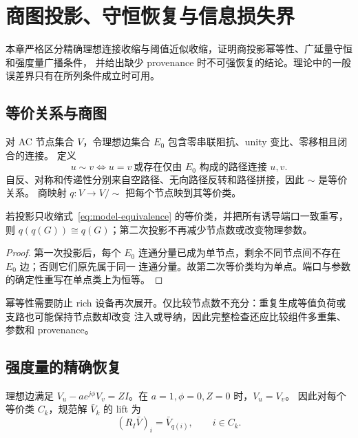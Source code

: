 \section{商图投影、守恒恢复与信息损失界}

\begin{theorynote}
本章严格区分精确理想连接收缩与阈值近似收缩，证明商投影幂等性、广延量守恒和强度量广播条件，
并给出缺少 provenance 时不可强恢复的结论。理论中的一般误差界只有在所列条件成立时可用。
\end{theorynote}

\subsection{等价关系与商图}

对 AC 节点集合 $V$，令理想边集合 $E_0$ 包含零串联阻抗、unity 变比、零移相且闭合的连接。
定义
\begin{equation}
 u\sim v\iff u=v\ \text{或存在仅由 }E_0\text{ 构成的路径连接 }u,v.
 \label{eq:model-equivalence}
\end{equation}
自反、对称和传递性分别来自空路径、无向路径反转和路径拼接，因此 $\sim$ 是等价关系。
商映射 $q:V\to V/{\sim}$ 把每个节点映到其等价类。

\begin{theorem}[精确商投影的幂等性]
若投影只收缩式~\eqref{eq:model-equivalence} 的等价类，并把所有诱导端口一致重写，则
$q(q(G))\cong q(G)$；第二次投影不再减少节点数或改变物理参数。
\end{theorem}
\begin{proof}
第一次投影后，每个 $E_0$ 连通分量已成为单节点，剩余不同节点间不存在 $E_0$ 边；否则它们原先属于同一
连通分量。故第二次等价类均为单点。端口与参数的确定性重写在单点类上为恒等。
\end{proof}

幂等性需要防止 rich 设备再次展开。仅比较节点数不充分：重复生成等值负荷或支路也可能保持节点数却改变
注入或导纳，因此完整检查还应比较组件多重集、参数和 provenance。

\subsection{强度量的精确恢复}

理想边满足 $V_u-ae^{j\phi}V_v=ZI$。在 $a=1,\phi=0,Z=0$ 时，$V_u=V_v$。
因此对每个等价类 $C_k$，规范解 $\bar V_k$ 的 lift 为
\begin{equation}
 (R_I\bar V)_i=\bar V_{q(i)},\qquad i\in C_k.
 \label{eq:model-intensive-lift}
\end{equation}

